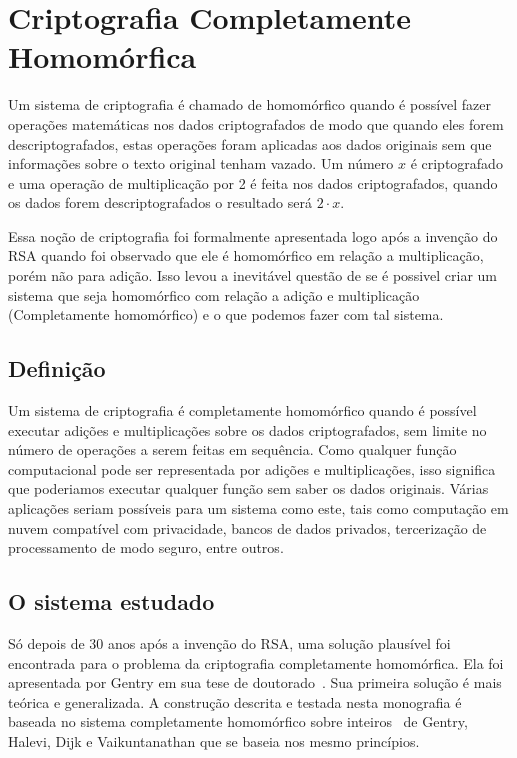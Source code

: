 \chapter{Criptografia Completamente Homomórfica}
\label{revisao}

Um sistema de criptografia é chamado de homomórfico quando é possível fazer operações matemáticas nos dados criptografados de modo que quando eles forem descriptografados, estas operações foram aplicadas aos dados originais sem que informações sobre o texto original tenham vazado.
Um número $x$ é criptografado e uma operação de multiplicação por 2 é feita nos dados criptografados, quando os dados forem descriptografados o resultado será $2 \cdot x$.

Essa noção de criptografia foi formalmente apresentada logo após a invenção do RSA quando foi observado que ele é homomórfico em relação a multiplicação, porém não para adição.
Isso levou a inevitável questão de se é possivel criar um sistema que seja homomórfico com relação a adição e multiplicação (Completamente homomórfico) e o que podemos fazer com tal sistema.

\section{Definição}
Um sistema de criptografia é completamente homomórfico quando é possível executar adições e multiplicações sobre os dados criptografados, sem limite no número de operações a serem feitas em sequência.
	Como qualquer função computacional pode ser representada por adições e multiplicações, isso significa que poderiamos executar qualquer função sem saber os dados originais. Várias aplicações seriam possíveis para um sistema como este, tais como computação em nuvem compatível com privacidade, bancos de dados privados, tercerização de processamento de modo seguro, entre outros.
	
\section{O sistema estudado}
Só depois de 30 anos após a invenção do RSA, uma solução plausível foi encontrada para o problema da criptografia completamente homomórfica. Ela foi apresentada por Gentry em sua tese de doutorado~\cite{gentrythesis}. Sua primeira solução é mais teórica e generalizada. A construção descrita e testada nesta monografia é baseada no sistema completamente homomórfico sobre inteiros~\cite{fheintegers} de Gentry, Halevi, Dijk e Vaikuntanathan que se baseia nos mesmo princípios.

